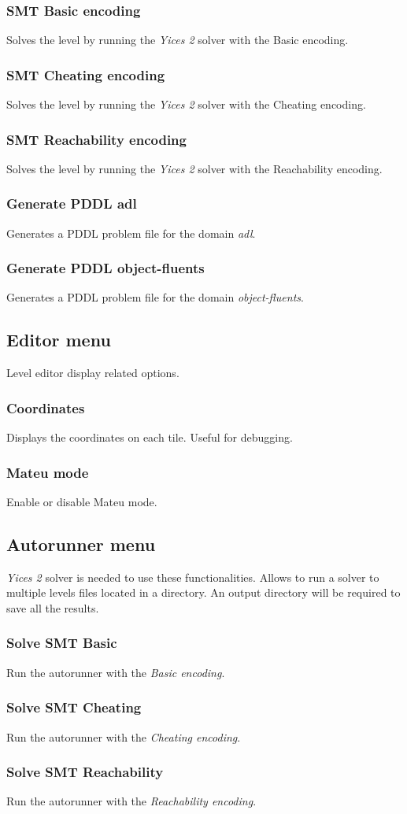 \documentclass{report}
\theoremstyle{plain}
\begin{document}
\subsubsection{SMT Basic encoding}
Solves the level by running the \emph{Yices 2} solver with the Basic encoding. 

\subsubsection{SMT Cheating encoding}
Solves the level by running the \emph{Yices 2} solver with the Cheating encoding.

\subsubsection{SMT Reachability encoding}
Solves the level by running the \emph{Yices 2} solver with the Reachability encoding. 

\subsubsection{Generate PDDL adl}
Generates a PDDL problem file for the domain \emph{adl}.

\subsubsection{Generate PDDL object-fluents}
Generates a PDDL problem file for the domain \emph{object-fluents}.

\subsection{Editor menu}
Level editor display related options.

\subsubsection{Coordinates}
Displays the coordinates on each tile. Useful for debugging.

\subsubsection{Mateu mode}
Enable or disable Mateu mode.

\subsection{Autorunner menu}
\emph{Yices 2} solver is needed to use these functionalities. Allows to run a solver to multiple levels files located in a directory. An output directory will be required to save all the results.

\subsubsection{Solve SMT Basic}
Run the autorunner with the \emph{Basic encoding}.

\subsubsection{Solve SMT Cheating}
Run the autorunner with the \emph{Cheating encoding}.

\subsubsection{Solve SMT Reachability}
Run the autorunner with the \emph{Reachability encoding}.
\end{document}
